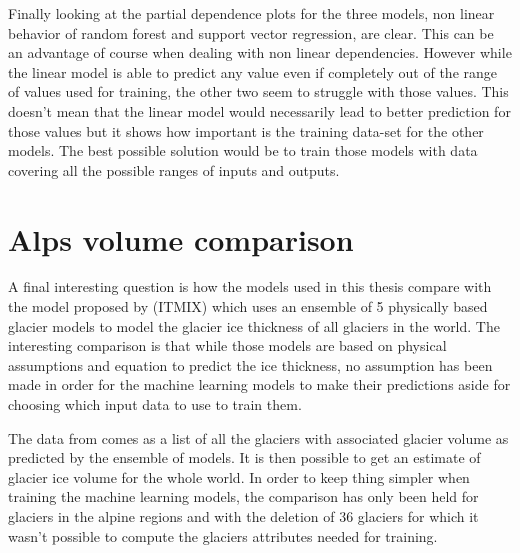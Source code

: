 Finally looking at the partial dependence plots for the three models, non linear behavior of random forest and support vector regression, are clear. This can be an advantage of course when dealing with non linear dependencies. However while the linear model is able to predict any value even if completely out of the range of values used for training, the other two seem to struggle with those values. This doesn't mean that the linear model would necessarily lead to better prediction for those values but it shows how important is the training data-set for the other models. The best possible solution would be to train those models with data covering all the possible ranges of inputs and outputs.

\section{Alps volume comparison}\label{disc-alps}
A final interesting question is how the models used in this thesis compare with the model proposed by \citet{Farinotti2019} (ITMIX) which uses an ensemble of 5 physically based glacier models to model the glacier ice thickness of all glaciers in the world. The interesting comparison is that while those models are based on physical assumptions and  equation to predict the ice thickness, no assumption has been made in order for the machine learning models to make their predictions aside for choosing which input data to use to train them.
 
The data from \citet{Farinotti2019} comes as a list of all the glaciers with associated glacier volume as predicted by the ensemble of models. It is then possible to get an estimate of glacier ice volume for the whole world.
In order to keep thing simpler when training the machine learning models, the comparison has only been held for glaciers in the alpine regions and with the deletion of 36 glaciers for which it wasn't possible to compute the glaciers attributes needed for training.

